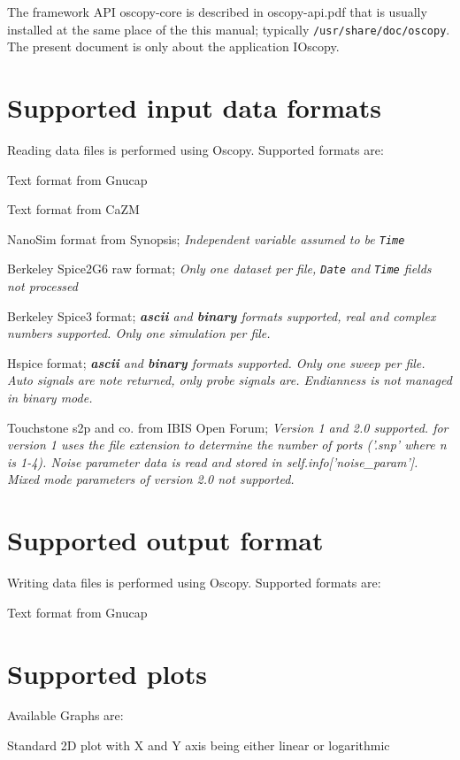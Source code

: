 \documentclass[a4paper,11pt]{report}
\renewenvironment{description}{%
\begin{basedescript}{%
\renewcommand{\makelabel}[1]{\bfseries##1}%
}%
}{%
\end{basedescript}%
}
\begin{document}
The framework API oscopy-core is described in oscopy-api.pdf that is usually installed at the same place of the this manual; typically \texttt{/usr/share/doc/oscopy}.
The present document is only about the application IOscopy.

\section{Supported input data formats}
Reading data files is performed using Oscopy. Supported formats are:
\begin{description}
\item[Gnucap] Text format from Gnucap
\item[Cazm] Text format from CaZM
\item[Nsout] NanoSim format from Synopsis; \textit{Independent variable assumed to be \texttt{Time}}
\item[Spice2raw] Berkeley Spice2G6 raw format; \textit{Only one dataset per file, \texttt{Date} and \texttt{Time} fields not processed}
\item[Spice3raw] Berkeley Spice3 format; \textit{\textbf{ascii} and \textbf{binary} formats supported, real and complex numbers supported. Only one simulation per file.}
\item[Hspice] Hspice format; \textit{\textbf{ascii} and \textbf{binary} formats supported. Only one sweep per file. Auto signals are note returned, only probe signals are. Endianness is not managed in binary mode.}
\item[Touchstone] Touchstone s2p and co. from IBIS Open Forum; \textit{Version 1 and 2.0 supported. for version 1 uses the file extension to determine the number of ports ('.snp' where n is 1-4). Noise parameter data is read and stored in self.info['noise\_param']. Mixed mode parameters of version 2.0 not supported.}
\end{description}

\section{Supported output format}
Writing data files is performed using Oscopy. Supported formats are:
\begin{description}
\item[gnucap] Text format from Gnucap
\end{description}

\section{Supported plots}
Available Graphs are:
\begin{description}
\item[linear] Standard 2D plot with X and Y axis being either linear or logarithmic
\end{description}
\end{document}

